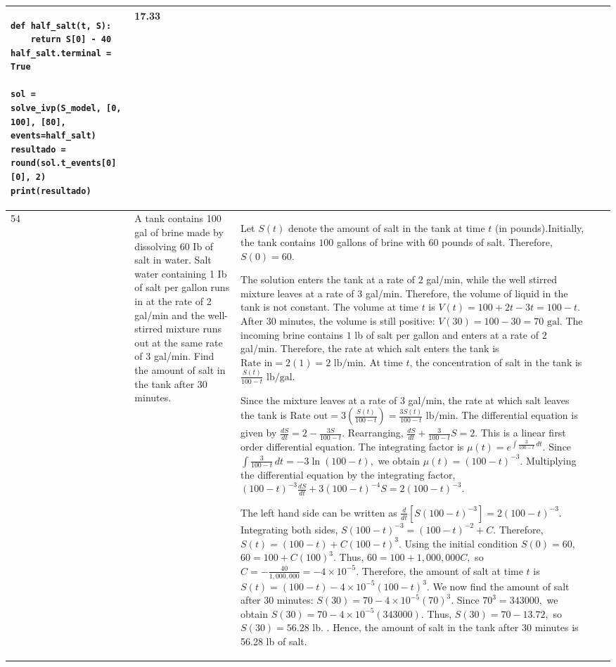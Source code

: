 \documentclass[a4paper,12pt]{article}
\begin{document}
\begin{longtable}{|p{0.3cm}|p{}|p{10cm}|p{}|p{1.5cm}|}
\begin{verbatim}
def half_salt(t, S):
    return S[0] - 40
half_salt.terminal = True

sol = solve_ivp(S_model, [0, 100], [80], events=half_salt)
resultado = round(sol.t_events[0][0], 2)
print(resultado)
\end{verbatim}& 17.33 \\ \hline 
 54          & A tank contains 100 gal of brine made by dissolving 60 Ib of salt in water. Salt water containing 1 Ib of salt per
gallon runs in at the rate of 2 gal/min and the well-stirred mixture runs out at the same rate of 3 gal/min. Find the
amount of salt in the tank after 30 minutes.


              &Let $S(t)$ denote the amount of salt in the tank at time $t$ (in pounds).Initially, the tank contains $100$ gallons of brine with $60$ pounds of salt. Therefore,$S(0)=60.$

The solution enters the tank at a rate of $2$ gal/min, while the well stirred mixture leaves at a rate of $3$ gal/min. Therefore, the volume of liquid in the tank is not constant.
The volume at time $t$ is $V(t)=100+2t-3t=100-t.$ After $30$ minutes, the volume is still positive: $V(30)=100-30=70\text{ gal}.$ The incoming brine contains $1$ lb of salt per gallon and enters at a rate of $2$ gal/min. Therefore, the rate at which salt enters the tank is $\text{Rate in}=2(1)=2\text{ lb/min}.$
At time $t$, the concentration of salt in the tank is $\frac{S(t)}{100-t}\text{ lb/gal}.$

Since the mixture leaves at a rate of $3$ gal/min, the rate at which salt leaves the tank is $\text{Rate out}=3\left(\frac{S(t)}{100-t}\right)
=\frac{3S(t)}{100-t}\text{ lb/min}.$ The differential equation is given by  $\frac{dS}{dt}=2-\frac{3S}{100-t}.$
Rearranging, $\frac{dS}{dt}+\frac{3}{100-t}S=2.$
This is a linear first order differential equation. The integrating factor is
$\mu(t)=e^{\int\frac{3}{100-t}\,dt}.$
Since $\int\frac{3}{100-t}\,dt=-3\ln(100-t),$
we obtain $\mu(t)=(100-t)^{-3}.$
Multiplying the differential equation by the integrating factor,
$(100-t)^{-3}\frac{dS}{dt}+3(100-t)^{-4}S
=2(100-t)^{-3}.$

The left hand side can be written as
$\frac{d}{dt}\left[S(100-t)^{-3}\right]
=2(100-t)^{-3}.$
Integrating both sides, $S(100-t)^{-3}=(100-t)^{-2}+C.$
Therefore, $S(t)=(100-t)+C(100-t)^3.$
Using the initial condition $S(0)=60$, $60=100+C(100)^3.$
Thus, $60=100+1,000,000C,$
so $C=-\frac{40}{1,000,000}=-4\times10^{-5}.$
Therefore, the amount of salt at time $t$ is $S(t)=(100-t)-4\times10^{-5}(100-t)^3.$
We now find the amount of salt after $30$ minutes:
$S(30)=70-4\times10^{-5}(70)^3.$
 Since $70^3=343000,$ we obtain $S(30)=70-4\times10^{-5}(343000).$
Thus, $S(30)=70-13.72,$ so $S(30)=56.28 $ lb.
.
Hence, the amount of salt in the tank after $30$ minutes is 56.28 lb of salt.


\end{longtable}
\end{document}
